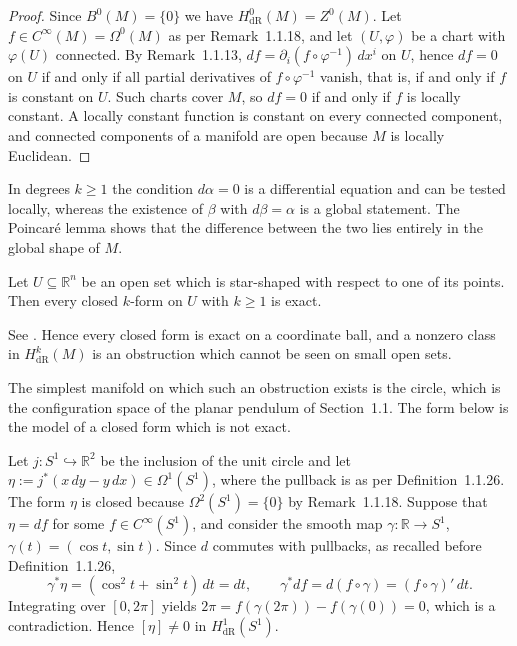 \begin{proof}
	Since $B^0(M)=\{0\}$ we have $H^0_{\mathrm{dR}}(M)=Z^0(M)$. Let $f\in C^\infty(M)=\Omega^0(M)$ as per Remark~1.1.18, and let $(U,\varphi)$ be a chart with $\varphi(U)$ connected. By Remark~1.1.13, $df=\partial_i(f\circ\varphi^{-1})\,dx^i$ on $U$, hence $df=0$ on $U$ if and only if all partial derivatives of $f\circ\varphi^{-1}$ vanish, that is, if and only if $f$ is constant on $U$. Such charts cover $M$, so $df=0$ if and only if $f$ is locally constant. A locally constant function is constant on every connected component, and connected components of a manifold are open because $M$ is locally Euclidean.
\end{proof}

In degrees $k\geq1$ the condition $d\alpha=0$ is a differential equation and can be tested locally, whereas the existence of $\beta$ with $d\beta=\alpha$ is a global statement. The Poincar\'e lemma shows that the difference between the two lies entirely in the global shape of $M$.

\begin{theorem}\label{thm:poincare}
	Let $U\subseteq\mathbb{R}^n$ be an open set which is star-shaped with respect to one of its points. Then every closed $k$-form on $U$ with $k\geq1$ is exact.
\end{theorem}

\noindent See \cite[TODO-location]{TODO-Lee13}. Hence every closed form is exact on a coordinate ball, and a nonzero class in $H^k_{\mathrm{dR}}(M)$ is an obstruction which cannot be seen on small open sets.

The simplest manifold on which such an obstruction exists is the circle, which is the configuration space of the planar pendulum of Section~1.1. The form below is the model of a closed form which is not exact.

\begin{example}\label{ex:circle-form}
	Let $j:S^1\hookrightarrow\mathbb{R}^2$ be the inclusion of the unit circle and let $\eta:=j^*(x\,dy-y\,dx)\in\Omega^1(S^1)$, where the pullback is as per Definition~1.1.26. The form $\eta$ is closed because $\Omega^2(S^1)=\{0\}$ by Remark~1.1.18. Suppose that $\eta=df$ for some $f\in C^\infty(S^1)$, and consider the smooth map $\gamma:\mathbb{R}\to S^1$, $\gamma(t)=(\cos t,\sin t)$. Since $d$ commutes with pullbacks, as recalled before Definition~1.1.26,
	\begin{equation*}
		\gamma^*\eta=(\cos^2t+\sin^2t)\,dt=dt, \qquad \gamma^*df=d(f\circ\gamma)=(f\circ\gamma)'\,dt.
	\end{equation*}
	Integrating over $[0,2\pi]$ yields $2\pi=f(\gamma(2\pi))-f(\gamma(0))=0$, which is a contradiction. Hence $[\eta]\neq0$ in $H^1_{\mathrm{dR}}(S^1)$.
\end{example}

